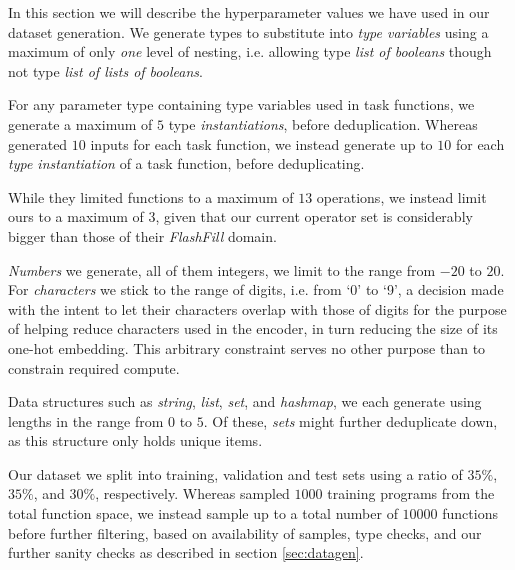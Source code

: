 \documentclass{article}
\begin{document}
In this section we will describe the hyperparameter values we have used in our dataset generation.
We generate types to substitute into \emph{type variables} using a maximum of only \emph{one} level of nesting,
i.e. allowing type \emph{list of booleans} though not type \emph{list of lists of booleans}.

For any parameter type containing type variables used in task functions,
we generate a maximum of $5$ type \emph{instantiations}, before deduplication.
Whereas \citet{nsps} generated $10$ inputs for each task function,
we instead generate up to $10$ for each \emph{type instantiation} of a task function, before deduplicating.

While they limited functions to a maximum of $13$ operations,
we instead limit ours to a maximum of $3$,
given that our current operator set is considerably bigger than those of their \emph{FlashFill} domain.

\emph{Numbers} we generate, all of them integers,
we limit to the range from $-20$ to $20$.
For \emph{characters} we stick to the range of digits, i.e. from `0' to `9',
a decision made with the intent to let their characters overlap
with those of digits for the purpose of helping reduce characters used in the encoder,
in turn reducing the size of its one-hot embedding.
This arbitrary constraint serves no other purpose than to constrain required compute.

Data structures such as \emph{string}, \emph{list}, \emph{set}, and \emph{hashmap},
we each generate using lengths in the range from $0$ to $5$.
Of these, \emph{sets} might further deduplicate down,
as this structure only holds unique items.

Our dataset we split into training, validation and test sets
using a ratio of $35\%$, $35\%$, and $30\%$, respectively.
Whereas \citet{nsps} sampled $1000$ training programs from the total function space,
we instead sample up to a total number of $10000$ functions before further filtering,
based on availability of samples, type checks,
and our further sanity checks as described in section \ref{sec:datagen}.
\end{document}
